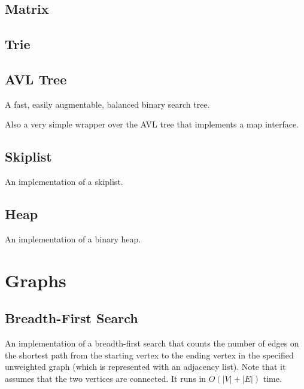 \documentclass[8pt,a4paper]{amsart}
\begin{document}

\subsection{Matrix}


\subsection{Trie}


\subsection{AVL Tree}
A fast, easily augmentable, balanced binary search tree.


Also a very simple wrapper over the AVL tree that implements a map interface.


\subsection{Skiplist} An implementation of a skiplist.


\subsection{Heap}
An implementation of a binary heap.


\section{Graphs}

\subsection{Breadth-First Search}

An implementation of a breadth-first search that counts the number of edges on
the shortest path from the starting vertex to the ending vertex in the
specified unweighted graph (which is represented with an adjacency list). Note
that it assumes that the two vertices are connected. It runs in $O(|V|+|E|)$
time.

\end{document}
